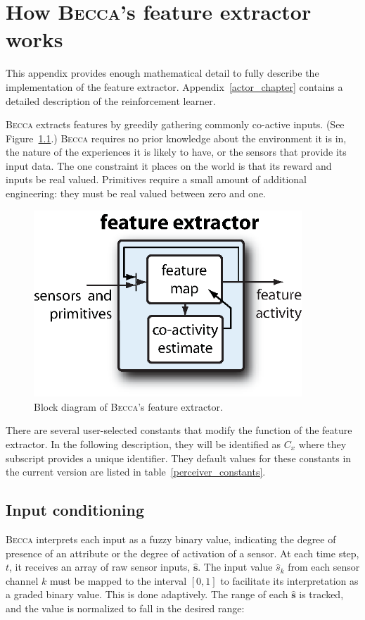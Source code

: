 \chapter{How \textsc{Becca}'s feature extractor works}
\label{perceiver_chapter}

This appendix provides enough mathematical detail to fully describe the implementation of the feature extractor. Appendix~\ref{actor_chapter} contains a detailed description of the reinforcement learner.

\textsc{Becca} extracts features by greedily gathering commonly co-active inputs. (See Figure~\ref{becca_feature_extractor}.)  \textsc{Becca} requires no prior knowledge about the environment it is in, the nature of the experiences it is likely to have, or the sensors that provide its input data. The one constraint it places on the world is that its reward and inputs be real valued. Primitives require a small amount of additional engineering: they must be real valued between zero and one. 

\begin{figure}
\centering 
\includegraphics[height=7cm]{figs/becca_feature_extractor.eps}
\caption{Block diagram of \textsc{Becca}'s feature extractor.}
\label{becca_feature_extractor}
\end{figure}

There are several user-selected constants that modify the function of the feature extractor. In the following description, they will be identified as $C_x$ where they subscript provides a unique identifier. They default values for these constants in the current version are listed in table~\ref{perceiver_constants}. 

\section{Input conditioning}
\textsc{Becca} interprets each input as a fuzzy binary value, indicating the degree of presence of an attribute or the degree of activation of a sensor. At each time step, $t$, it receives an array of raw sensor inputs, $\hat{\mathbf{s}}$. The input value $\hat{s}_k$ from each sensor channel $k$ must be mapped to the interval $[0,1]$ to facilitate its interpretation as a graded binary value. This is done adaptively. The range of each $\hat{\mathbf{s}}$ is tracked, and the value is normalized to fall in the desired range:

